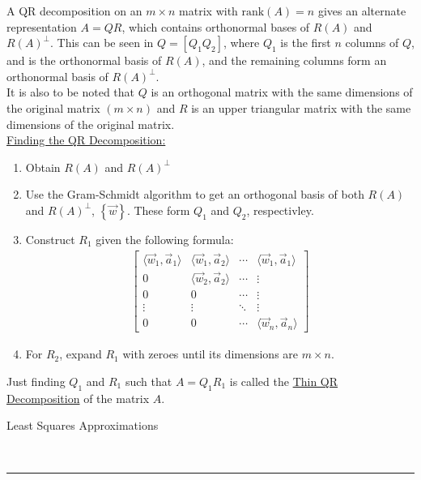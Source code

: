 \documentclass{article}
\newcommand{\header}[1]{\begin{large}\noindent #1\end{large}\\\rule{\textwidth}{0.5pt}}
\newcommand{\gap}{\medskip\\}
\newcommand{\sheader}[1]{\underline{#1:}}
\newcommand{\curly}[1]{\left\{#1\right\}}
\begin{document}
A QR decomposition on an $m \times n$ matrix with $\textrm{rank}(A) = n$
gives an alternate representation $A = QR$, which contains orthonormal
bases of $R(A)$ and $R(A)^\perp$. This can be seen in $Q = [Q_1 Q_2]$,
where $Q_1$ is the first $n$ columns of $Q$, and is the orthonormal
basis of $R(A)$, and the remaining columns form an orthonormal basis
of $R(A)^\perp$. 
\gap
It is also to be noted that $Q$ is an orthogonal matrix with the same
dimensions of the original matrix $(m \times n)$ and $R$ is an upper
triangular matrix with the same dimensions of the original matrix.
\gap
\sheader{Finding the QR Decomposition}
\begin{enumerate}
    \item Obtain $R(A)$ and $R(A)^\perp$
    \item Use the Gram-Schmidt algorithm to get an orthogonal basis
    of both $R(A)$ and $R(A)^\perp$, $\curly{\vec{w}}$. These form $Q_1$ and $Q_2$, respectivley.
    \item Construct $R_1$ given the following formula:
    \begin{align*}
        \begin{bmatrix}
            \langle \vec{w}_1, \vec{a}_1 \rangle & \langle \vec{w}_1, \vec{a}_2 \rangle & \cdots & \langle \vec{w}_1, \vec{a}_1 \rangle \\
            0 & \langle \vec{w}_2, \vec{a}_2 \rangle & \cdots & \vdots \\
            0 & 0 & \cdots & \vdots \\
            \vdots & \vdots & \ddots & \vdots\\
            0 & 0 & \cdots & \langle \vec{w}_n, \vec{a}_n \rangle
        \end{bmatrix}
    \end{align*}
    \item For $R_2$, expand $R_1$ with zeroes until its dimensions
    are $m \times n$.
\end{enumerate}

Just finding $Q_1$ and $R_1$ such that $A = Q_1 R_1$ is called the 
\underline{Thin QR Decomposition} of the matrix $A$.
\gap
\header{Least Squares Approximations}
\end{document}
